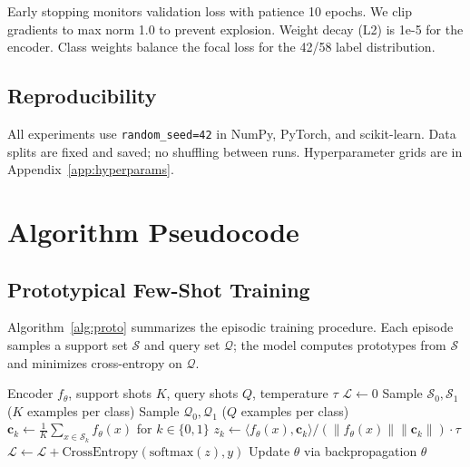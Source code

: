 Early stopping monitors validation loss with patience 10 epochs. We clip gradients to max norm 1.0 to prevent explosion. Weight decay (L2) is 1e-5 for the encoder. Class weights balance the focal loss for the 42/58 label distribution.

\subsection{Reproducibility}

All experiments use \texttt{random\_seed=42} in NumPy, PyTorch, and scikit-learn. Data splits are fixed and saved; no shuffling between runs. Hyperparameter grids are in Appendix~\ref{app:hyperparams}.

\section{Algorithm Pseudocode}

\subsection{Prototypical Few-Shot Training}

Algorithm~\ref{alg:proto} summarizes the episodic training procedure. Each episode samples a support set $\mathcal{S}$ and query set $\mathcal{Q}$; the model computes prototypes from $\mathcal{S}$ and minimizes cross-entropy on $\mathcal{Q}$.

\begin{algorithm}[htbp]
\caption{Episodic Prototypical Training}
\label{alg:proto}
\small
\begin{algorithmic}[1]
\Require Encoder $f_\theta$, support shots $K$, query shots $Q$, temperature $\tau$
\State $\mathcal{L} \gets 0$
\State Sample $\mathcal{S}_0, \mathcal{S}_1$ ($K$ examples per class)
\State Sample $\mathcal{Q}_0, \mathcal{Q}_1$ ($Q$ examples per class)
\State $\mathbf{c}_k \gets \frac{1}{K}\sum_{x \in \mathcal{S}_k} f_\theta(x)$ for $k \in \{0,1\}$
\State $z_k \gets \langle f_\theta(x), \mathbf{c}_k \rangle / (\|f_\theta(x)\| \|\mathbf{c}_k\|) \cdot \tau$
\State $\mathcal{L} \gets \mathcal{L} + \text{CrossEntropy}(\text{softmax}(z), y)$
\EndFor
\State Update $\theta$ via backpropagation
\EndFor
\State \Return $\theta$
\end{algorithmic}
\end{algorithm}

